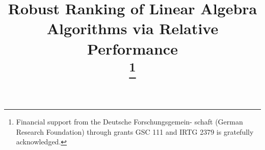 \documentclass[conference]{IEEEtran}
\begin{document}
\title{Robust Ranking of Linear Algebra Algorithms via Relative Performance\\
\thanks{Financial support from the Deutsche Forschungsgemein- schaft (German Research Foundation) through grants GSC 111 and IRTG 2379 is gratefully acknowledged.
}
}

\author{
\and
{}
}

\maketitle
\end{document}
